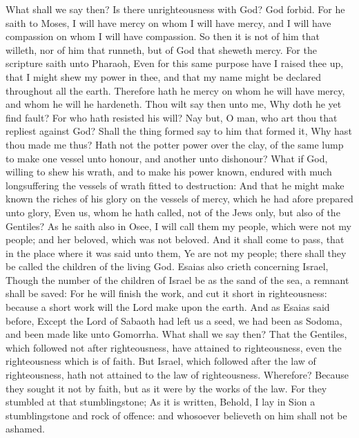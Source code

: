  What shall we say then? Is there unrighteousness with
God? God forbid.  For he saith to Moses, I will have
mercy on whom I will have mercy, and I will have compassion on whom I
will have compassion.  So then it is not of him that
willeth, nor of him that runneth, but of God that sheweth mercy.
 For the scripture saith unto Pharaoh, Even for this same
purpose have I raised thee up, that I might shew my power in thee, and
that my name might be declared throughout all the earth. 
Therefore hath he mercy on whom he will have mercy, and whom he will he
hardeneth.  Thou wilt say then unto me, Why doth he yet
find fault? For who hath resisted his will?  Nay but, O
man, who art thou that repliest against God? Shall the thing formed say
to him that formed it, Why hast thou made me thus?  Hath
not the potter power over the clay, of the same lump to make one vessel
unto honour, and another unto dishonour?  What if God,
willing to shew his wrath, and to make his power known, endured with
much longsuffering the vessels of wrath fitted to destruction:
 And that he might make known the riches of his glory on
the vessels of mercy, which he had afore prepared unto glory,
 Even us, whom he hath called, not of the Jews only, but
also of the Gentiles?  As he saith also in Osee, I will
call them my people, which were not my people; and her beloved, which
was not beloved.  And it shall come to pass, that in the
place where it was said unto them, Ye are not my people; there shall
they be called the children of the living God.  Esaias
also crieth concerning Israel, Though the number of the children of
Israel be as the sand of the sea, a remnant shall be saved:
 For he will finish the work, and cut it short in
righteousness: because a short work will the Lord make upon the earth.
 And as Esaias said before, Except the Lord of Sabaoth
had left us a seed, we had been as Sodoma, and been made like unto
Gomorrha.  What shall we say then? That the Gentiles,
which followed not after righteousness, have attained to righteousness,
even the righteousness which is of faith.  But Israel,
which followed after the law of righteousness, hath not attained to the
law of righteousness.  Wherefore? Because they sought it
not by faith, but as it were by the works of the law. For they stumbled
at that stumblingstone;  As it is written, Behold, I lay
in Sion a stumblingstone and rock of offence: and whosoever believeth on
him shall not be ashamed.

